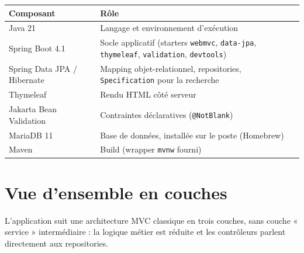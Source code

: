 \documentclass[a4paper,11pt]{article}
\newcommand{\code}[1]{\texttt{#1}}
\begin{document}
\begin{center}
\begin{tabularx}{\linewidth}{@{}lX@{}}
\toprule
\textbf{Composant} & \textbf{Rôle} \\
\midrule
Java 21 & Langage et environnement d'exécution \\
Spring Boot 4.1 & Socle applicatif (starters \code{webmvc}, \code{data-jpa},
  \code{thymeleaf}, \code{validation}, \code{devtools}) \\
Spring Data JPA / Hibernate & Mapping objet-relationnel, repositories,
  \code{Specification} pour la recherche \\
Thymeleaf & Rendu HTML côté serveur \\
Jakarta Bean Validation & Contraintes déclaratives (\code{@NotBlank}) \\
MariaDB 11 & Base de données, installée sur le poste (Homebrew) \\
Maven & Build (wrapper \code{mvnw} fourni) \\
\bottomrule
\end{tabularx}
\end{center}

\section{Vue d'ensemble en couches}

L'application suit une architecture MVC classique en trois couches, sans
couche « service » intermédiaire : la logique métier est réduite et les
contrôleurs parlent directement aux repositories.
\end{document}
